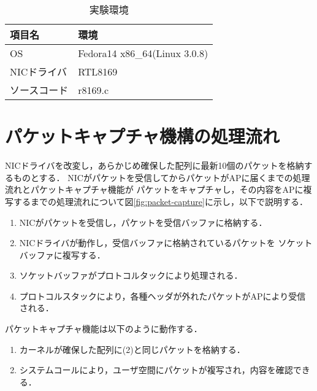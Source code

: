 \documentclass[12pt]{jsarticle}
\def\labelenumi{(\theenumi)}
\begin{document}
\begin{table}[htbp]
    \caption{実験環境}
    \label{kankyou}
    \begin{center}
        \begin{tabular}{l|l}   \hline \hline 
            項目名      & 環境    \\ \hline
            OS          & Fedora14 x86\_64(Linux 3.0.8)  \\ 
            NICドライバ & RTL8169    \\ 
            ソースコード& r8169.c \\ \hline
        \end{tabular}
    \end{center}
\end{table}

\section{パケットキャプチャ機構の処理流れ}\label{syorinagare}
NICドライバを改変し，あらかじめ確保した配列に最新10個のパケットを格納するものとする．
NICがパケットを受信してからパケットがAPに届くまでの処理流れとパケットキャプチャ機能が
パケットをキャプチャし，その内容をAPに複写するまでの処理流れについて図\ref{fig:packet-capture}に示し，以下で説明する．
\begin{enumerate}
    \item NICがパケットを受信し，パケットを受信バッファに格納する．
    \item NICドライバが動作し，受信バッファに格納されているパケットを
        ソケットバッファに複写する．
    \item ソケットバッファがプロトコルタックにより処理される．
    \item プロトコルスタックにより，各種ヘッダが外れたパケットがAPにより受信される．
\end{enumerate}

パケットキャプチャ機能は以下のように動作する．
\begin{enumerate}
\renewcommand{\labelenumi}{(\Alph{enumi})}
    \item カーネルが確保した配列に(2)と同じパケットを格納する．
    \item システムコールにより，ユーザ空間にパケットが複写され，内容を確認できる．
\end{enumerate}
\end{document}
